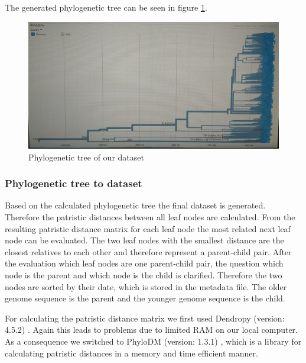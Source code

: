 The generated phylogenetic tree can be seen in figure \ref{phylogeneticTree}.

\begin{figure}[ht]
	\centering
	\includegraphics[width=1.0\linewidth]{figures/phylogeneticTree.jpg}
	\caption{Phylogenetic tree of our dataset \cite{own representation}}
	\label{phylogeneticTree}
\end{figure}

\subsubsection{Phylogenetic tree to dataset}
\label{ch:approachAc}

Based on the calculated phylogenetic tree the final dataset is generated. Therefore the patristic distances between all leaf nodes are calculated. From the resulting patristic distance matrix for each leaf node the most related next leaf node can be evaluated. The two leaf nodes with the smallest distance are the closest relatives to each other and therefore represent a parent-child pair. After the evaluation which leaf nodes are one parent-child pair, the question which node is the parent and which node is the child is clarified. Therefore the two nodes are sorted by their date, which is stored in the metadata file. The older genome sequence is the parent and the younger genome sequence is the child.

For calculating the patristic distance matrix we first used Dendropy (version: 4.5.2) \cite{DendroPyPhylogeneticComputing}. Again this leads to problems due to limited RAM on our local computer. As a consequence we switched to PhyloDM (version: 1.3.1) \cite{aaron_mussig_2020_4089111}, which is a library for calculating patristic distances in a memory and time efficient manner.

